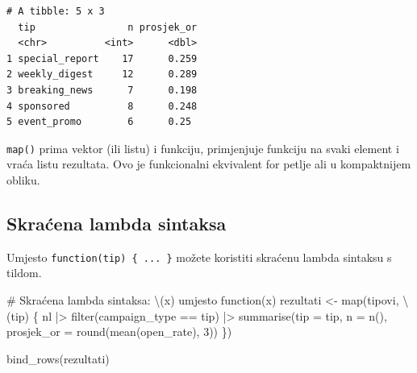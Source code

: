 \documentclass[
  croatian,
  letterpaper,
  DIV=11,
  numbers=noendperiod]{scrartcl}
\newenvironment{Shaded}{\begin{snugshade}}{\end{snugshade}}
\newcommand{\AttributeTok}[1]{\textcolor[rgb]{0.40,0.45,0.13}{#1}}
\newcommand{\CommentTok}[1]{\textcolor[rgb]{0.37,0.37,0.37}{#1}}
\newcommand{\ControlFlowTok}[1]{\textcolor[rgb]{0.00,0.23,0.31}{\textbf{#1}}}
\newcommand{\DecValTok}[1]{\textcolor[rgb]{0.68,0.00,0.00}{#1}}
\newcommand{\FunctionTok}[1]{\textcolor[rgb]{0.28,0.35,0.67}{#1}}
\newcommand{\NormalTok}[1]{\textcolor[rgb]{0.00,0.23,0.31}{#1}}
\newcommand{\OtherTok}[1]{\textcolor[rgb]{0.00,0.23,0.31}{#1}}
\newcommand{\SpecialCharTok}[1]{\textcolor[rgb]{0.37,0.37,0.37}{#1}}
\begin{document}
\begin{Shaded}
\end{Shaded}

\begin{verbatim}
# A tibble: 5 x 3
  tip                n prosjek_or
  <chr>          <int>      <dbl>
1 special_report    17      0.259
2 weekly_digest     12      0.289
3 breaking_news      7      0.198
4 sponsored          8      0.248
5 event_promo        6      0.25 
\end{verbatim}

\texttt{map()} prima vektor (ili listu) i funkciju, primjenjuje funkciju
na svaki element i vraća listu rezultata. Ovo je funkcionalni ekvivalent
for petlje ali u kompaktnijem obliku.

\subsection{Skraćena lambda
sintaksa}\label{skraux107ena-lambda-sintaksa}

Umjesto \texttt{function(tip)\ \{\ ...\ \}} možete koristiti skraćenu
lambda sintaksu s tildom.

\begin{Shaded}
\begin{Highlighting}[]
\CommentTok{\# Skraćena lambda sintaksa: \textbackslash{}(x) umjesto function(x)}
\NormalTok{rezultati }\OtherTok{\textless{}{-}} \FunctionTok{map}\NormalTok{(tipovi, \textbackslash{}(tip) \{}
\NormalTok{  nl }\SpecialCharTok{|\textgreater{}}
    \FunctionTok{filter}\NormalTok{(campaign\_type }\SpecialCharTok{==}\NormalTok{ tip) }\SpecialCharTok{|\textgreater{}}
    \FunctionTok{summarise}\NormalTok{(}\AttributeTok{tip =}\NormalTok{ tip, }\AttributeTok{n =} \FunctionTok{n}\NormalTok{(), }\AttributeTok{prosjek\_or =} \FunctionTok{round}\NormalTok{(}\FunctionTok{mean}\NormalTok{(open\_rate), }\DecValTok{3}\NormalTok{))}
\NormalTok{\})}

\FunctionTok{bind\_rows}\NormalTok{(rezultati)}
\end{Highlighting}
\end{Shaded}
\end{document}
